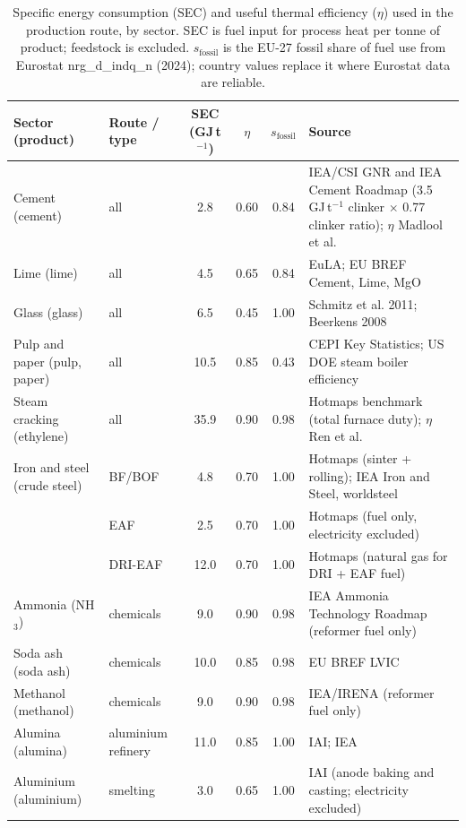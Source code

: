 \documentclass[11pt]{article}
\begin{document}
\begin{table}[h]
\centering
\small
\caption{Specific energy consumption (SEC) and useful thermal efficiency ($\eta$) used in the production route, by sector. SEC is fuel input for process heat per tonne of product; feedstock is excluded. $s_{\mathrm{fossil}}$ is the EU-27 fossil share of fuel use from Eurostat nrg\_d\_indq\_n (2024)\cite{eurostat_nrg_d_indq_n}; country values replace it where Eurostat data are reliable.}
\label{tab:sec}
\begin{tabular}{p{2.9cm} p{2.1cm} c c c p{4.6cm}}
\toprule
Sector (product) & Route / type & SEC (GJ\,t$^{-1}$) & $\eta$ & $s_{\mathrm{fossil}}$ & Source \\
\midrule
Cement (cement) & all & 2.8 & 0.60 & 0.84 & IEA/CSI GNR and IEA Cement Roadmap (3.5\,GJ\,t$^{-1}$ clinker $\times$ 0.77 clinker ratio); $\eta$ Madlool et al.\cite{madlool2011} \\
Lime (lime) & all & 4.5 & 0.65 & 0.84 & EuLA; EU BREF Cement, Lime, MgO \\
Glass (glass) & all & 6.5 & 0.45 & 1.00 & Schmitz et al. 2011; Beerkens 2008 \\
Pulp and paper (pulp, paper) & all & 10.5 & 0.85 & 0.43 & CEPI Key Statistics; US DOE steam boiler efficiency \\
Steam cracking (ethylene) & all & 35.9 & 0.90 & 0.98 & Hotmaps benchmark (total furnace duty); $\eta$ Ren et al.\cite{ren2006} \\
Iron and steel (crude steel) & BF/BOF & 4.8 & 0.70 & 1.00 & Hotmaps (sinter + rolling); IEA Iron and Steel, worldsteel \\
 & EAF & 2.5 & 0.70 & 1.00 & Hotmaps (fuel only, electricity excluded) \\
 & DRI-EAF & 12.0 & 0.70 & 1.00 & Hotmaps (natural gas for DRI + EAF fuel) \\
Ammonia (NH$_3$) & chemicals & 9.0 & 0.90 & 0.98 & IEA Ammonia Technology Roadmap (reformer fuel only) \\
Soda ash (soda ash) & chemicals & 10.0 & 0.85 & 0.98 & EU BREF LVIC \\
Methanol (methanol) & chemicals & 9.0 & 0.90 & 0.98 & IEA/IRENA (reformer fuel only) \\
Alumina (alumina) & aluminium refinery & 11.0 & 0.85 & 1.00 & IAI; IEA \\
Aluminium (aluminium) & smelting & 3.0 & 0.65 & 1.00 & IAI (anode baking and casting; electricity excluded) \\
\bottomrule
\end{tabular}
\end{table}
\end{document}
